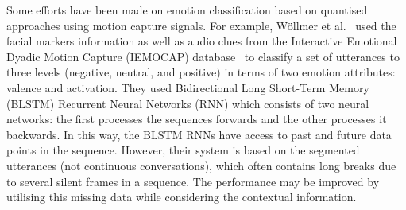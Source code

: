 \documentclass[10pt,journal,cspaper,compsoc]{IEEEtran}
\begin{document}


Some efforts have been made on emotion classification based on quantised approaches using motion capture signals. For example, W{\"o}llmer et al.~\cite{wollmer2010context} used the facial markers information as well as audio clues from the Interactive Emotional Dyadic Motion Capture (IEMOCAP) database~\cite{Busso08} to classify a set of utterances to three levels (negative, neutral, and positive) in terms of two emotion attributes: valence and activation. They used Bidirectional Long Short-Term Memory (BLSTM) Recurrent Neural Networks (RNN) which consists of two neural networks: the first processes the sequences forwards and the other processes it backwards. In this way, the BLSTM RNNs have access to past and future data points in the sequence. However, their system is based on the segmented utterances (not continuous conversations), which often contains long breaks due to several silent frames in a sequence. The performance may be improved by utilising this missing data while considering the contextual information.
\end{document}
